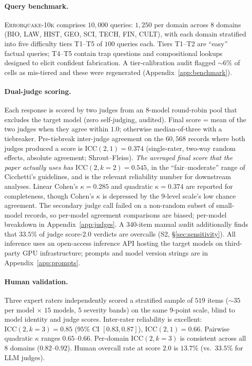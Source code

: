 \documentclass{article}
\begin{document}
\paragraph{Query benchmark.} \textsc{Errorquake-10k} comprises
$10{,}000$ queries: $1{,}250$ per domain across $8$ domains (BIO, LAW,
HIST, GEO, SCI, TECH, FIN, CULT), with each domain stratified into
five difficulty tiers T1--T5 of $100$ queries each. Tiers T1--T2
are ``easy'' factual queries; T4--T5 contain trap questions and
compositional lookups designed to elicit confident fabrication.
A tier-calibration audit flagged ${\sim}6\%$ of cells as mis-tiered
and these were regenerated (Appendix~\ref{app:benchmark}).

\paragraph{Dual-judge scoring.} Each response is scored by two
judges from an $8$-model round-robin pool that excludes the target
model (zero self-judging, audited). Final score = mean of the two
judges when they agree within $1.0$; otherwise median-of-three with
a tiebreaker. Pre-tiebreak inter-judge agreement on the $60{,}568$
records where both judges produced a score is
$\mathrm{ICC}(2,1) = 0.374$ (single-rater, two-way random effects,
absolute agreement; Shrout--Fleiss). \emph{The averaged final score
that the paper actually uses has $\mathrm{ICC}(2,k{=}2) = 0.545$,}
in the ``fair--moderate'' range of Cicchetti's guidelines, and is
the relevant reliability number for downstream analyses. Linear
Cohen's $\kappa = 0.285$ and quadratic $\kappa = 0.374$ are reported
for completeness, though Cohen's $\kappa$ is depressed by the $9$-level
scale's low chance agreement. The secondary judge call failed on a
non-random subset of small-model records, so per-model agreement
comparisons are biased; per-model breakdown in
Appendix~\ref{app:judges}. A $340$-item manual audit additionally
finds that $33.5\%$ of judge score-$2.0$ verdicts are overcalls
(S2, \S\ref{sec:sensitivity}). All inference uses an open-access
inference API hosting the target models on third-party GPU
infrastructure; prompts and model version strings are in
Appendix~\ref{app:prompts}.

\paragraph{Human validation.}\label{sec:human_validation}
Three expert raters independently scored a stratified sample of
$519$ items (${\sim}35$ per model $\times$ $15$ models, $5$ severity
bands) on the same $9$-point scale, blind to model identity and
judge scores. Inter-rater reliability is excellent:
$\mathrm{ICC}(2,k{=}3) = 0.85$ ($95\%$ CI $[0.83, 0.87]$),
$\mathrm{ICC}(2,1) = 0.66$. Pairwise quadratic $\kappa$ ranges
$0.65$--$0.66$. Per-domain $\mathrm{ICC}(2,k{=}3)$ is consistent
across all $8$ domains ($0.82$--$0.92$). Human overcall rate at
score $2.0$ is $13.7\%$ (vs.\ $33.5\%$ for LLM judges).
\end{document}
